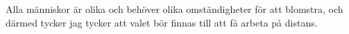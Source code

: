 Alla människor är olika och behöver olika omständigheter för att blomstra, och därmed tycker jag tycker att valet bör finnas till att få arbeta på distans.





















































